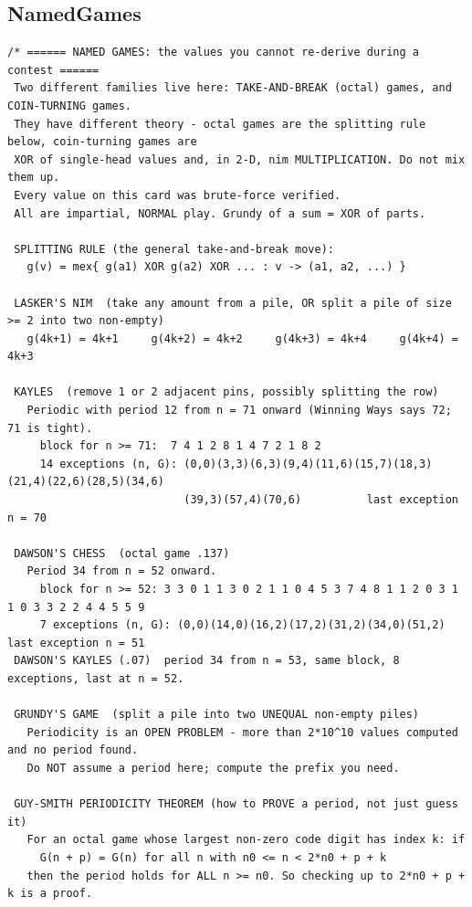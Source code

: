 \documentclass[9pt,a4paper,twocolumn]{extarticle}
\begin{document}
\filbreak
\subsection{NamedGames}
\nopagebreak
\begin{lstlisting}
/* ====== NAMED GAMES: the values you cannot re-derive during a contest ======
 Two different families live here: TAKE-AND-BREAK (octal) games, and COIN-TURNING games.
 They have different theory - octal games are the splitting rule below, coin-turning games are
 XOR of single-head values and, in 2-D, nim MULTIPLICATION. Do not mix them up.
 Every value on this card was brute-force verified.
 All are impartial, NORMAL play. Grundy of a sum = XOR of parts.

 SPLITTING RULE (the general take-and-break move):
   g(v) = mex{ g(a1) XOR g(a2) XOR ... : v -> (a1, a2, ...) }

 LASKER'S NIM  (take any amount from a pile, OR split a pile of size >= 2 into two non-empty)
   g(4k+1) = 4k+1     g(4k+2) = 4k+2     g(4k+3) = 4k+4     g(4k+4) = 4k+3

 KAYLES  (remove 1 or 2 adjacent pins, possibly splitting the row)
   Periodic with period 12 from n = 71 onward (Winning Ways says 72; 71 is tight).
     block for n >= 71:  7 4 1 2 8 1 4 7 2 1 8 2
     14 exceptions (n, G): (0,0)(3,3)(6,3)(9,4)(11,6)(15,7)(18,3)(21,4)(22,6)(28,5)(34,6)
                           (39,3)(57,4)(70,6)          last exception n = 70

 DAWSON'S CHESS  (octal game .137)
   Period 34 from n = 52 onward.
     block for n >= 52: 3 3 0 1 1 3 0 2 1 1 0 4 5 3 7 4 8 1 1 2 0 3 1 1 0 3 3 2 2 4 4 5 5 9
     7 exceptions (n, G): (0,0)(14,0)(16,2)(17,2)(31,2)(34,0)(51,2)     last exception n = 51
 DAWSON'S KAYLES (.07)  period 34 from n = 53, same block, 8 exceptions, last at n = 52.

 GRUNDY'S GAME  (split a pile into two UNEQUAL non-empty piles)
   Periodicity is an OPEN PROBLEM - more than 2*10^10 values computed and no period found.
   Do NOT assume a period here; compute the prefix you need.

 GUY-SMITH PERIODICITY THEOREM (how to PROVE a period, not just guess it)
   For an octal game whose largest non-zero code digit has index k: if
     G(n + p) = G(n) for all n with n0 <= n < 2*n0 + p + k
   then the period holds for ALL n >= n0. So checking up to 2*n0 + p + k is a proof.


\end{lstlisting}
\end{document}
